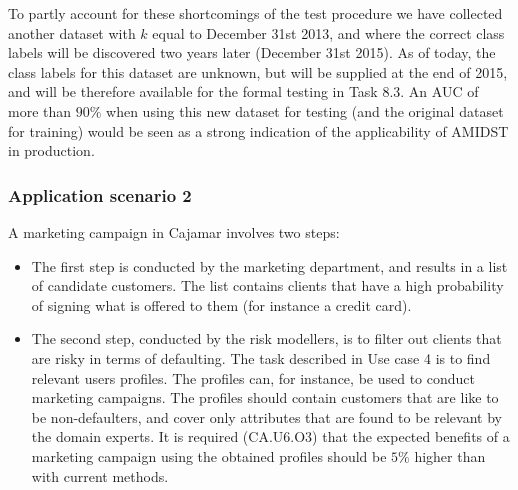 \documentclass{article}
\theoremstyle{theorem}
\theoremstyle{definition}
\begin{document}
\ede

To partly account for these shortcomings of the test procedure we have collected another dataset with $k$ equal to December 31st 2013, and where the correct class labels will be discovered two years later (December 31st 2015).
As of today, the class labels for this dataset are unknown, but will be supplied at the end of 2015, and will be therefore available for the formal testing in Task 8.3. 
An AUC of more than $90\%$ when using this new dataset for testing (and the original dataset for training) would be seen as a strong indication of the applicability of AMIDST in production.






\subsubsection{Application scenario 2}




A marketing campaign in Cajamar involves two steps:
\begin{itemize}
 \item The first step is conducted by the marketing department, and results in a list of candidate customers. 
The list contains clients that have a high probability of signing what is offered to them (for instance a credit card).  
\item The second step, conducted by the risk modellers, is to filter out clients that are risky in terms of defaulting.
The task described in Use case 4 is to find relevant users profiles. The profiles can, for instance, be used to conduct marketing campaigns. The profiles should contain customers that are like to be non-defaulters, and cover only attributes that are found to be relevant by the domain experts. It is required (CA.U6.O3) that the expected benefits of a marketing campaign using the obtained profiles should be $5\%$ higher than with current methods. 
\end{itemize}  
\end{document}
